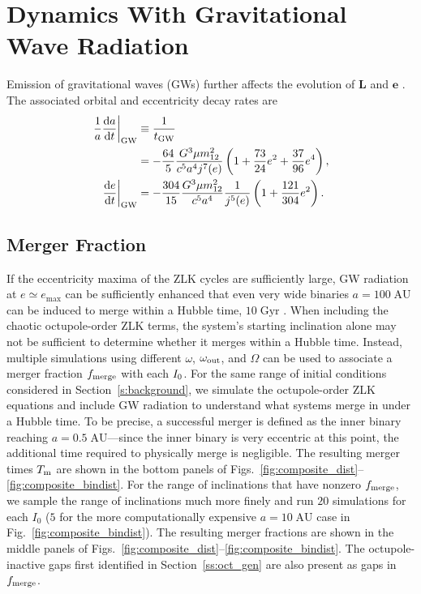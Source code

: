 \documentclass[
        fleqn,
        usenatbib,
    ]{mnras}
\newcommand*{\rd}[2]{\frac{\mathrm{d}#1}{\mathrm{d}#2}}
\newcommand*{\at}[1]{\left.#1\right|}
\newcommand*{\p}[1]{\left(#1\right)}
\newcommand*{\bm}[1]{\mathbf{#1}}
\begin{document}
\section{Dynamics With Gravitational Wave Radiation}\label{s:with_gw}

Emission of gravitational waves (GWs) further affects the evolution of $\bm{L}$
and $\bm{e}$ \citep{peters1964, LL18}. The associated orbital and eccentricity
decay rates are
\begin{align}
    \at{\frac{1}{a}\rd{a}{t}}_{\rm GW} &\equiv \frac{1}{t_{\rm GW}}\nonumber\\
        &= -\frac{64}{5}\frac{G^3 \mu m_{12}^2}{c^5a^4j^7(e)}
            \p{1 + \frac{73}{24}e^2 + \frac{37}{96}e^4}\label{eq:def_tgw},\\
    \at{\rd{e}{t}}_{\rm GW} &= -\frac{304}{15}\frac{G^3 \mu m_{12}^2}{c^5a^4}
        \frac{1}{j^{5}(e)}\p{1 + \frac{121}{304}e^2}\label{eq:dedt_gw}.
\end{align}

\subsection{Merger Fraction}

If the eccentricity maxima of the ZLK cycles are sufficiently large, GW
radiation at $e \simeq e_{\max}$ can be sufficiently enhanced that even very
wide binaries $a = 100\;\mathrm{AU}$ can be induced to merge within a Hubble
time, $10\;\mathrm{Gyr}$ \citep{LL18, LL19}. When including the chaotic
octupole-order ZLK terms, the system's starting inclination alone may not be
sufficient to determine whether it merges within a Hubble time. Instead,
multiple simulations using different $\omega$, $\omega_{\rm out}$, and $\Omega$
can be used to associate a merger fraction $f_{\rm merge}$ with each $I_{\rm
0}$. For the same range of initial conditions considered in
Section~\ref{s:background}, we simulate the octupole-order ZLK equations
and include GW radiation to understand what systems merge in under a Hubble
time. To be precise, a successful merger is defined as the inner binary reaching
$a = 0.5\;\mathrm{AU}$---since the inner binary is very eccentric at this point,
the additional time required to physically merge is negligible. The resulting
merger times $T_{\rm m}$ are shown in the bottom panels of
Figs.~\ref{fig:composite_dist}--\ref{fig:composite_bindist}. For the range of
inclinations that have nonzero $f_{\rm merge}$, we sample the range of
inclinations much more finely and run $20$ simulations for each $I_0$ ($5$ for
the more computationally expensive $a = 10\;\mathrm{AU}$ case in
Fig.~\ref{fig:composite_bindist}). The resulting merger fractions are shown in
the middle panels of
Figs.~\ref{fig:composite_dist}--\ref{fig:composite_bindist}. The
octupole-inactive gaps first identified in Section~\ref{ss:oct_gen} are also
present as gaps in $f_{\rm merge}$.
\end{document}
